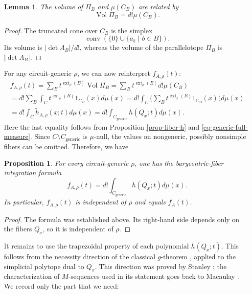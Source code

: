 \documentclass[12pt]{amsart}
\newtheorem{proposition}[theorem]{Proposition}
\newtheorem{lemma}[theorem]{Lemma}
\numberwithin{equation}{section}
\numberwithin{theorem}{section}
\newcommand{\op}{\operatorname}
\begin{document}
\begin{lemma}
  \label{lemma-volume}
  The volume of $\Pi_B$ and $\mu(C_B)$ are related by
  \begin{equation}
    \op{Vol}\Pi_B=d! \mu(C_B).
  \end{equation}
\end{lemma}
\begin{proof}
  The truncated cone over $C_B$ is the simplex
  \begin{equation*}
    \op{conv}(\{0\}\cup\{a_b \,\,|\,\, b\in B\}).
  \end{equation*}
  Its volume is $|\det A_B|/d!$, whereas the volume of the parallelotope $\Pi_B$ is $|\det A_B|$.
\end{proof}

For any circuit-generic $\rho$, we can now reinterpret $f_{A,\rho}(t)$:
\begin{gather*}
  f_{A,\rho}(t)=\sum_{B}t^{\op{ext}_{\rho}(B)}\op{Vol}\Pi_B = \sum_{B}t^{\op{ext}_{\rho}(B)} d!\mu(C_B)\\
  = d! \sum_{B}\int_C t^{\op{ext}_{\rho}(B)} 1_{C_B}(x) d\mu(x) = d! \int_C \big(\sum_{B}t^{\op{ext}_{\rho}(B)} 1_{C_B}(x)\big) d\mu(x)\\
  = d! \int_C \tilde{h}_{A,\rho}(x;t) d\mu(x) = d! \int_{C_{\mathrm{generic}}} h(Q_x;t) d\mu(x).
\end{gather*}
Here the last equality follows from Proposition \ref{prop-fiber-h} and \eqref{eq-generic-full-measure}. Since $C\setminus C_{\mathrm{generic}}$ is $\mu$-null, the values on nongeneric, possibly nonsimple fibers can be omitted.
Therefore, we have

\begin{proposition}
  \label{prop-bary-formula}
  For every circuit-generic $\rho$, one has the barycentric-fiber integration formula
  \begin{equation}
    f_{A,\rho}(t)=d! \int_{C_{\mathrm{generic}}} h(Q_x;t) d\mu(x).
  \end{equation}
  In particular, $f_{A,\rho}(t)$ is independent of $\rho$ and equals $f_A(t)$.
\end{proposition}
\begin{proof}
  The formula was established above. Its right-hand side depends only on the fibers $Q_x$, so it is independent of $\rho$.
\end{proof}


It remains to use the trapezoidal property of each polynomial $h(Q_x;t)$. This follows from the necessity direction of the classical $g$-theorem \cite[Theorem~8.35]{Zie}, applied to the simplicial polytope dual to $Q_x$. This direction was proved by Stanley \cite{StanleyGTheorem}; the characterization of $M$-sequences used in its statement goes back to Macaulay \cite{Mac27}. We record only the part that we need:
\end{document}
